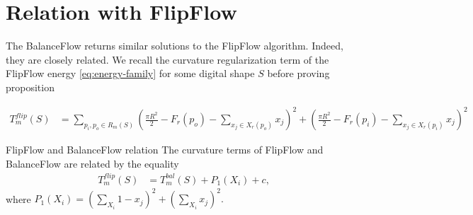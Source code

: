 \section{Relation with FlipFlow}
	The BalanceFlow returns similar solutions to the FlipFlow algorithm. Indeed, they are closely related. We recall the curvature regularization term of the FlipFlow energy \eqref{eq:energy-family} for some digital shape $S$ before proving proposition

\begin{align}
T_{m}^{flip}(S) &= \sum_{ p_i,p_o \in R_m(S)}{ ( \frac{\pi R^2}{2} - F_r(p_o) - \sum_{x_j \in X_r(p_o)}{x_j})^2 + (\frac{\pi R^2}{2} - F_r(p_i) - \sum_{x_j \in X_r(p_i)}{x_j})^2 }
\label{eq:curvature-term}
\end{align}

\begin{proposition}{FlipFlow and BalanceFlow relation}
The curvature terms of FlipFlow and BalanceFlow are related by the equality
\begin{align*}
T_{m}^{flip}(S) &= T_{m}^{bal}(S) + P_1(X_i) + c,
\end{align*}
where $P_1(X_i) = (\sum_{X_i}{ 1-x_j})^2 + (\sum_{X_i}{x_j})^2.$
\label{prop:flipflow-balanceflow-relation}
\end{proposition}

